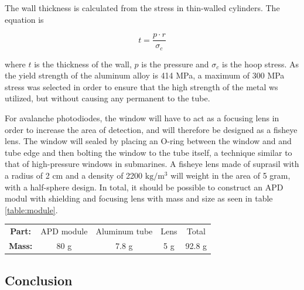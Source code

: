 The wall thickness is calculated from the stress in thin-walled cylinders. The equation is \cite{Wall_thickness}

\begin{equation}
    t = \frac{p \cdot r}{\sigma _c}
\end{equation}

where $t$ is the thickness of the wall, $p$ is the pressure and $\sigma _c$ is the hoop stress. As the yield strength of the aluminum alloy is 414 MPa, a maximum of 300 MPa stress was selected in order to ensure that the high strength of the metal ws utilized, but without causing any permanent to the tube. 

For avalanche photodiodes, the window will have to act as a focusing lens in order to increase the area of detection, and will therefore be designed as a fisheye lens. The window will sealed by placing an O-ring between the window and and tube edge and then bolting the window to the tube itself, a technique similar to that of high-pressure windows in submarines. A fisheye lens made of suprasil with a radius of 2 cm and a density of 2200 $\mathrm{kg/m^3}$ will weight in the area of 5 gram, with a half-sphere design. In total, it should be possible to construct an APD modul with shielding and focusing lens with mass and size as seen in table \ref{table:module}. 

\begin{center}
\label{table:module}
\begin{tabular}{|c|c|c|c|c|}
 \hline
               
 \textbf{Part:} & APD module & Aluminum tube & Lens & Total \\ 
 \textbf{Mass:} & 80 g & 7.8 g & 5 g & 92.8 g  \\ 
 \hline
\end{tabular}
\end{center}

\subsection{Conclusion}


